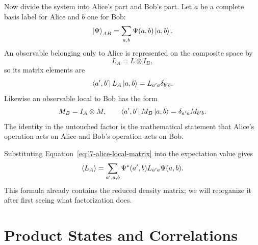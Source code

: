 Now divide the system into Alice's part and Bob's part. Let \(a\) be a complete basis label for Alice and \(b\) one for Bob:
\begin{equation}
\left\lvert\Psi\right\rangle_{AB}
=\sum_{a,b}\Psi(a,b)\left\lvert a,b\right\rangle.
\label{eq:l7-composite-expansion}
\end{equation}
An observable belonging only to Alice is represented on the composite space by
\begin{equation}
L_A=L\otimes I_B,
\end{equation}
so its matrix elements are
\begin{equation}
\left\langle a',b'\right\rvert L_A\left\lvert a,b\right\rangle
=L_{a'a}\delta_{b'b}.
\label{eq:l7-alice-local-matrix}
\end{equation}
Likewise an observable local to Bob has the form
\begin{equation}
M_B=I_A\otimes M,
\qquad
\left\langle a',b'\right\rvert M_B\left\lvert a,b\right\rangle
=\delta_{a'a}M_{b'b}.
\label{eq:l7-bob-local-matrix}
\end{equation}
The identity in the untouched factor is the mathematical statement that Alice's operation acts on Alice and Bob's operation acts on Bob.

Substituting Equation~\eqref{eq:l7-alice-local-matrix} into the expectation value gives
\begin{equation}
\left\langle L_A\right\rangle
=\sum_{a',a,b}
\Psi^*(a',b)L_{a'a}\Psi(a,b).
\label{eq:l7-local-expectation}
\end{equation}
This formula already contains the reduced density matrix; we will reorganize it after first seeing what factorization does.

\begin{classroomqa}
\end{classroomqa}

\begin{classroomqa}
\end{classroomqa}

\section{Product States and Correlations}

